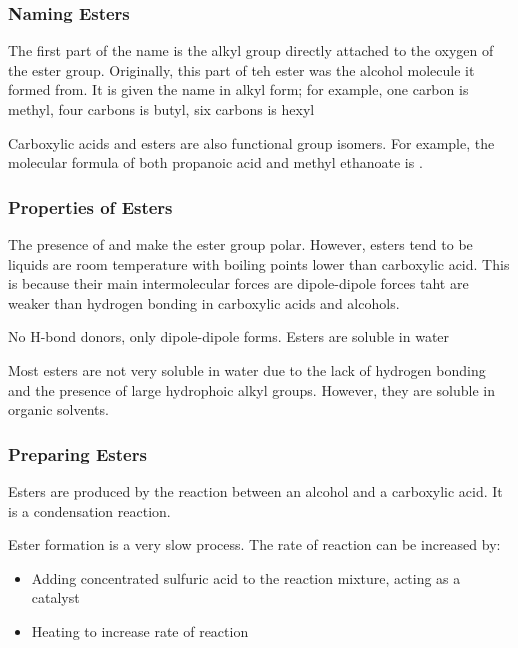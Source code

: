 		\subsubsection{Naming Esters}
		
			The first part of the name is the alkyl group directly attached to the oxygen of the ester group. Originally, this part of teh ester was the alcohol molecule it formed from. It is given the name in alkyl form; for example, one carbon is methyl, four carbons is butyl, six carbons is hexyl

			Carboxylic acids and esters are also functional group isomers. For example, the molecular formula of both propanoic acid and methyl ethanoate is .

		\subsubsection{Properties of Esters}
		
			The presence of  and  make the ester group polar. However, esters tend to be liquids are room temperature with boiling points lower than carboxylic acid. This is because their main intermolecular forces are dipole-dipole forces taht are weaker than hydrogen bonding in carboxylic acids and alcohols.
			
			\begin{center}
			\end{center}

			No H-bond donors, only dipole-dipole forms. Esters are soluble in water

			Most esters are not very soluble in water due to the lack of hydrogen bonding and the presence of large hydrophoic alkyl groups. However, they are soluble in organic solvents.

		\subsubsection{Preparing Esters}
		
			Esters are produced by the reaction between an alcohol and a carboxylic acid. It is a condensation reaction.

			Ester formation is a very slow process. The rate of reaction can be increased by:

				\begin{itemize}
					\item Adding concentrated sulfuric acid to the reaction mixture, acting as a catalyst
					\item Heating to increase rate of reaction
				\end{itemize}

